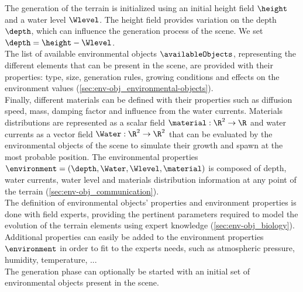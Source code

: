 The generation of the terrain is initialized using an initial height field $\height$ and a water level $\Wlevel$. The height field provides variation on the depth $\depth$, which can influence the generation process of the scene. We set $\depth = \height - \Wlevel$. \\
The list of available environmental objects $\availableObjects$, representing the different elements that can be present in the scene, are provided with their properties: type, size, generation rules, growing conditions and effects on the environment values (\cref{sec:env-obj_environmental-objects}). \\
Finally, different materials can be defined with their properties such as diffusion speed, mass, damping factor and influence from the water currents. Materials distributions are represented as a scalar field $\material: \R^2 \to \R$ and water currents as a vector field $\Water: \R^2 \to \R^2$ that can be evaluated by the environmental objects of the scene to simulate their growth and spawn at the most probable position. The environmental properties $\environment = (\depth, \Water, \Wlevel, \material)$ is composed of depth, water currents, water level and materials distribution information at any point of the terrain (\cref{sec:env-obj_communication}). \\
The definition of environmental objects' properties and environment properties is done with field experts, providing the pertinent parameters required to model the evolution of the terrain elements using expert knowledge (\cref{sec:env-obj_biology}). Additional properties can easily be added to the environment properties $\environment$ in order to fit to the experts needs, such as atmospheric pressure, humidity, temperature, ... \\
The generation phase can optionally be started with an initial set of environmental objects present in the scene. 

